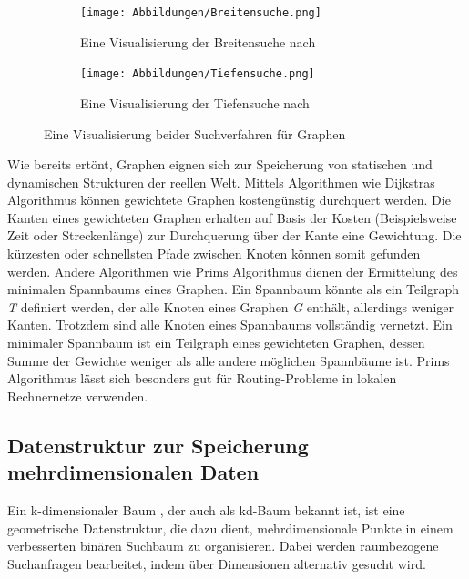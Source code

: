 \begin{figure}[t]
	\centering
	\begin{subfigure}[h]{0.49\textwidth}
		\texttt{[image: Abbildungen/Breitensuche.png]}
		\centering
		\caption{Eine Visualisierung der Breitensuche nach \textcite[228]{knebl_algorithmen_2021}}
		\label{fig: breitensuche}
	\end{subfigure}
	\hfill
	\begin{subfigure}[h]{0.49\textwidth}
		\texttt{[image: Abbildungen/Tiefensuche.png]}
		\centering
		\caption{Eine Visualisierung der Tiefensuche nach \textcite[232]{knebl_algorithmen_2021}}
		\label{fig: tiefensuche}
	\end{subfigure}
	\caption{Eine Visualisierung beider Suchverfahren für Graphen}
	\label{fig: graph_search_functions}
\end{figure}

Wie bereits ertönt, Graphen eignen sich zur Speicherung von statischen und dynamischen Strukturen der reellen Welt. Mittels Algorithmen wie Dijkstras Algorithmus können gewichtete Graphen kostengünstig durchquert werden. Die Kanten eines gewichteten Graphen erhalten auf Basis der Kosten (Beispielsweise Zeit oder Streckenlänge) zur Durchquerung über der Kante eine Gewichtung. Die kürzesten oder schnellsten Pfade zwischen Knoten können somit gefunden werden. Andere Algorithmen wie Prims Algorithmus dienen der Ermittelung des minimalen Spannbaums eines Graphen. Ein Spannbaum könnte als ein Teilgraph \textit{T} definiert werden, der alle Knoten eines Graphen \textit{G} enthält, allerdings weniger Kanten. Trotzdem sind alle Knoten eines Spannbaums vollständig vernetzt. Ein minimaler Spannbaum ist ein Teilgraph eines gewichteten Graphen, dessen Summe der Gewichte weniger als alle andere möglichen Spannbäume ist. Prims Algorithmus lässt sich besonders gut für Routing-Probleme in lokalen Rechnernetze verwenden. \autocite[277-282]{hubwieser_fundamente_2015}

\subsection{Datenstruktur zur Speicherung mehrdimensionalen Daten}

Ein k-dimensionaler Baum , der auch als kd-Baum bekannt ist, ist eine geometrische Datenstruktur, die dazu dient, mehrdimensionale Punkte in einem verbesserten binären Suchbaum zu organisieren. Dabei werden raumbezogene Suchanfragen bearbeitet, indem über Dimensionen alternativ gesucht wird. \autocite[92]{saha_advanced_2019} \autocite{bentley_fast_1978}

